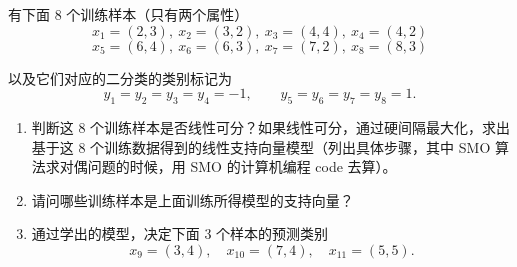 \documentclass[11pt,letter,notitlepage]{ctexart}
\theoremstyle{definition}
\begin{document}
    \newpage

    \begin{solution}
        
    \end{solution}

    \newpage

    \begin{exercise}[线性可分判定与硬间隔支持向量机]
有下面 8 个训练样本（只有两个属性）
\[
x_1=(2,3),\ x_2=(3,2),\ x_3=(4,4),\ x_4=(4,2)
\]
\[
x_5=(6,4),\ x_6=(6,3),\ x_7=(7,2),\ x_8=(8,3)
\]

以及它们对应的二分类的类别标记为
\[
y_1=y_2=y_3=y_4=-1,\qquad y_5=y_6=y_7=y_8=1.
\]

\begin{enumerate}
    \item 判断这 8 个训练样本是否线性可分？如果线性可分，通过硬间隔最大化，求出基于这 8 个训练数据得到的线性支持向量模型（列出具体步骤，其中 SMO 算法求对偶问题的时候，用 SMO 的计算机编程 code 去算）。

    \item 请问哪些训练样本是上面训练所得模型的支持向量？

    \item 通过学出的模型，决定下面 3 个样本的预测类别
    \[
    x_9=(3,4),\quad x_{10}=(7,4),\quad x_{11}=(5,5).
    \]
\end{enumerate}
    \end{exercise}

    \newpage

    \begin{solution}
        
    \end{solution}

    \newpage
\end{document}
